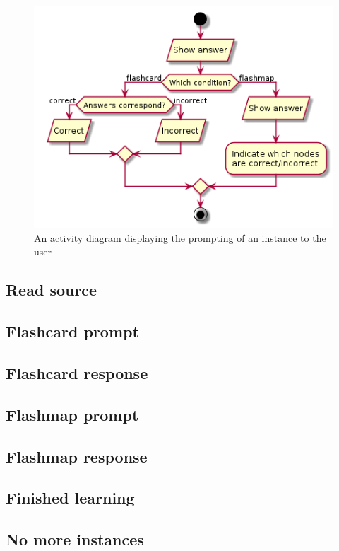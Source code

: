 \begin{figure}[h!]
\centering
    \includegraphics[width=.8\textwidth]{img/learningclient.png}
\caption{An activity diagram displaying the prompting of an instance to the user}
\label{fig:learningclient}
\end{figure}

\subsection{Read source}

\subsection{Flashcard prompt}

\subsection{Flashcard response}

\subsection{Flashmap prompt}

\subsection{Flashmap response}

\subsection{Finished learning}

\subsection{No more instances}

